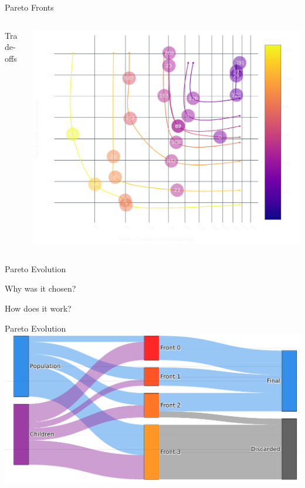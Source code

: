 \documentclass[aspectratio=169]{beamer}
\begin{document}
\begin{frame}{{Pareto Fronts}}
  \begin{columns}[T]
      \begin{column}{.4\linewidth}
          \begin{vfilleditems}
              \item {\Huge Trade-offs}
          \end{vfilleditems}
      \end{column}
      \begin{column}{.6\linewidth}
      \includegraphics[width=0.9\linewidth, keepaspectratio]{figures/total_pareto_overview.pdf}
      \end{column}
  \end{columns}
\end{frame}

\begin{frame}{Pareto Evolution}
    \begin{vfilleditems}
        \item Why was it chosen?
        \item How does it work?
    \end{vfilleditems}
\end{frame}

\begin{frame}{Pareto Evolution}
    \includegraphics[width=1.0\linewidth, keepaspectratio]{figures/paretoev.pdf}
\end{frame}
\end{document}
